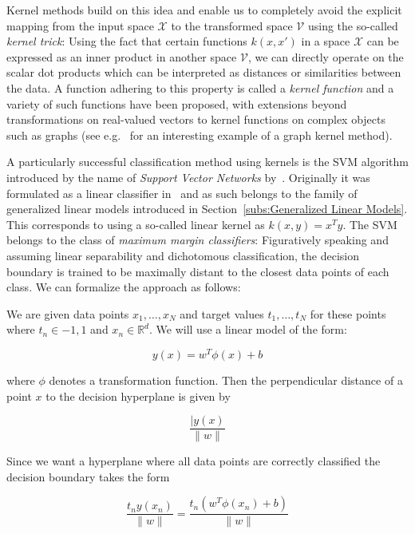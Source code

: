 Kernel methods build on this idea and enable us to completely avoid the explicit mapping from the input space $\mathcal{X}$ to the transformed space $\mathcal{V}$ using the so-called \emph{kernel trick}: Using the fact that certain functions $k(x, x')$ in a space $\mathcal{X}$ can be expressed as an inner product in another space $\mathcal{V}$, we can directly operate on the scalar dot products which can be interpreted as distances or similarities between the data. A function adhering to this property is called a \emph{kernel function} and a variety of such functions have been proposed, with extensions beyond transformations on real-valued vectors to kernel functions on complex objects such as graphs (see e.g.~\cite{Shervashidze:2011aa} for an interesting example of a graph kernel method).

A particularly successful classification method using kernels is the \gls{SVM} algorithm introduced by the name of \emph{Support Vector Networks} by~\cite{Cortes:aa}. Originally it was formulated as a linear classifier in~\cite{Vapnik:1982aa} and as such belongs to the family of generalized linear models introduced in Section~\ref{subs:Generalized Linear Models}. This corresponds to using a so-called linear kernel as $k(x, y) = x^T y$. The \gls{SVM} belongs to the class of \emph{maximum margin classifiers}: Figuratively speaking and assuming linear separability and dichotomous classification, the decision boundary is trained to be maximally distant to the closest data points of each class. We can formalize the approach as follows:

We are given data points $x_1, \ldots, x_N$ and target values $t_1, \ldots, t_N$ for these points where $t_n \in {-1, 1}$ and $x_n \in \mathbb{R}^d$. We will use a linear model of the form:

\begin{equation}
	y(x) = w^T \phi(x) + b
	\label{eq:svm linear model}
\end{equation}

where $\phi$ denotes a transformation function. Then the perpendicular distance of a point $x$ to the decision hyperplane is given by

\begin{equation}
	\frac{|y(x)}{\|w\|}
\end{equation}

Since we want a hyperplane where all data points are correctly classified the decision boundary takes the form

\begin{equation}
	\frac{t_n y(x_n)}{\|w\|} = \frac{t_n (w^T \phi(x_n) + b)}{\|w\|}
\end{equation}

